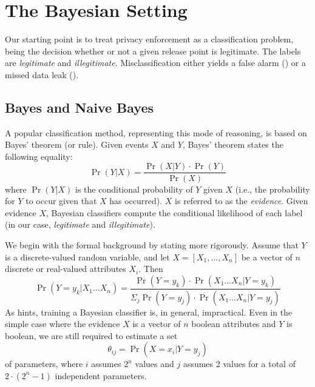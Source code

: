 \section{The Bayesian Setting}\label{Se:bayes}

Our starting point is to treat privacy enforcement as a classification problem, being the decision whether or not a given release point is legitimate.  The labels are \emph{legitimate} and \emph{illegitimate}. Misclassification either yields a false alarm () or a missed data leak (). 

\subsection{Bayes and Naive Bayes}


A popular classification method, representing this mode of reasoning, is based on Bayes' theorem (or rule). Given events $X$ and $Y$, Bayes' theorem states the following equality:
\begin{equation}\label{Eq:bayes}
	\Pr(Y | X) = \frac{\Pr(X | Y) \cdot \Pr(Y)}{\Pr(X)}
\end{equation}
where $\Pr(Y | X)$ is the conditional probability of $Y$ given $X$ (i.e., the probability for $Y$ to occur given that $X$ has occurred).
%
$X$ is referred to as the \emph{evidence}. Given evidence $X$, Bayesian classifiers compute the conditional likelihood of each label (in our case, \emph{legitimate} and \emph{illegitimate}). 

We begin with the formal background by stating  more rigorously. Assume that $Y$ is a discrete-valued random variable, and let $X=\left[ X_1,\ldots,X_n \right]$ be a vector of $n$ discrete or real-valued attributes $X_i$. Then
\begin{equation}\label{Eq:fullbayes}
	\Pr(Y=y_k | X_1 \ldots X_n) = \frac{\Pr(Y=y_k) \cdot \Pr(X_1 \ldots X_n | Y=y_k)}{\Sigma_j \Pr(Y=y_j) \cdot \Pr(X_1 \ldots X_n | Y=y_j)}
\end{equation}
As  hints, training a Bayesian classifier is, in general, impractical. Even in the simple case where the evidence $X$ is a vector of $n$ boolean attributes and $Y$ is boolean, we are still required to estimate a set
$$
	\theta_{ij} = \Pr(X=x_i|Y=y_j)
$$
of parameters, where $i$ assumes $2^n$ values and $j$ assumes 2 values for a total of $2 \cdot (2^n - 1)$ independent parameters.

